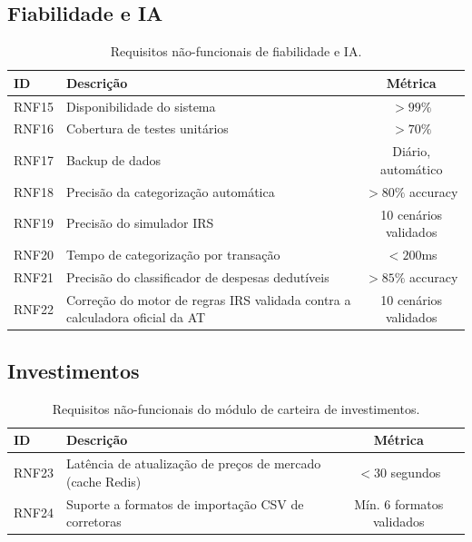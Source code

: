 \subsection{Fiabilidade e IA}

\begin{table}[H]
\centering
\caption{Requisitos não-funcionais de fiabilidade e IA.}
\label{tab:rnf-fiab}
\begin{tabularx}{\textwidth}{l X c}
\toprule
\textbf{ID} & \textbf{Descrição} & \textbf{Métrica} \\
\midrule
RNF15 & Disponibilidade do sistema & $> 99\%$ \\
RNF16 & Cobertura de testes unitários & $> 70\%$ \\
RNF17 & Backup de dados & Diário, automático \\
RNF18 & Precisão da categorização automática & $> 80\%$ accuracy \\
RNF19 & Precisão do simulador \ac{IRS} & 10 cenários validados \\
RNF20 & Tempo de categorização por transação & $< 200$ms \\
RNF21 & Precisão do classificador de despesas dedutíveis & $> 85\%$ accuracy \\
RNF22 & Correção do motor de regras \ac{IRS} validada contra a calculadora oficial da \ac{AT} & 10 cenários validados \\
\bottomrule
\end{tabularx}
\end{table}

\subsection{Investimentos}

\begin{table}[H]
\centering
\caption{Requisitos não-funcionais do módulo de carteira de investimentos.}
\label{tab:rnf-investimentos}
\begin{tabularx}{\textwidth}{l X c}
\toprule
\textbf{ID} & \textbf{Descrição} & \textbf{Métrica} \\
\midrule
RNF23 & Latência de atualização de preços de mercado (cache Redis) & $< 30$ segundos \\
RNF24 & Suporte a formatos de importação CSV de corretoras & Mín. 6 formatos validados \\
\bottomrule
\end{tabularx}
\end{table}


